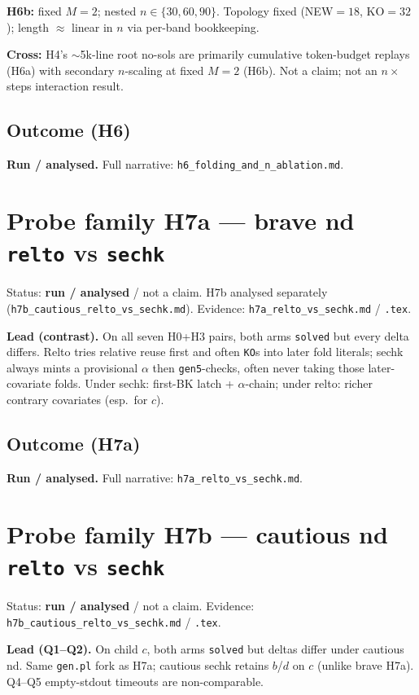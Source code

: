 \documentclass[11pt]{article}
\begin{document}
\textbf{H6b:} fixed $M{=}2$; nested $n\in\{30,60,90\}$. Topology fixed
(NEW${=}18$, KO${=}32$); length $\approx$ linear in $n$ via per-band bookkeeping.

\textbf{Cross:} H4's $\sim$5k-line root no-sols are primarily cumulative token-budget
replays (H6a) with secondary $n$-scaling at fixed $M{=}2$ (H6b).
Not a claim; not an $n\times$steps interaction result.

\subsection{Outcome (H6)}

\textbf{Run / analysed.}
Full narrative: \texttt{h6\_folding\_and\_n\_ablation.md}.


\section{Probe family H7a --- brave nd \texttt{relto} vs \texttt{sechk}}

Status: \textbf{run / analysed} / not a claim. H7b analysed separately
(\texttt{h7b\_cautious\_relto\_vs\_sechk.md}).
Evidence: \texttt{h7a\_relto\_vs\_sechk.md} / \texttt{.tex}.

\textbf{Lead (contrast).}
On all seven H0+H3 pairs, both arms \texttt{solved} but every delta differs.
Relto tries relative reuse first and often \texttt{KO}s into later fold
literals; sechk always mints a provisional $\alpha$ then \texttt{gen5}-checks,
often never taking those later-covariate folds.
Under sechk: first-BK latch + $\alpha$-chain; under relto: richer contrary
covariates (esp.\ for $c$).

\subsection{Outcome (H7a)}
\textbf{Run / analysed.} Full narrative: \texttt{h7a\_relto\_vs\_sechk.md}.


\section{Probe family H7b --- cautious nd \texttt{relto} vs \texttt{sechk}}

Status: \textbf{run / analysed} / not a claim.
Evidence: \texttt{h7b\_cautious\_relto\_vs\_sechk.md} / \texttt{.tex}.

\textbf{Lead (Q1--Q2).}
On child $c$, both arms \texttt{solved} but deltas differ under cautious nd.
Same \texttt{gen.pl} fork as H7a; cautious sechk retains $b$/$d$ on $c$
(unlike brave H7a). Q4--Q5 empty-stdout timeouts are non-comparable.
\end{document}
